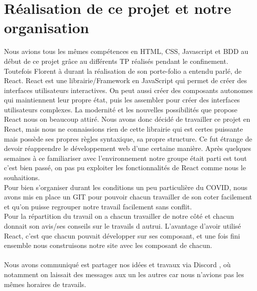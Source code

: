 \documentclass[12pt]{report}
\begin{document}
\section{Réalisation de ce projet et notre organisation}
	Nous avions tous les mêmes compétences en HTML, CSS, Javascript et BDD au début de ce projet grâce au différents TP réalisés pendant le confinement. Toutefois Florent à durant la réalisation de son porte-folio a entendu parlé, de React. React\cite{React} est une librairie/Framework en JavaScript qui permet de créer des interfaces utilisateurs interactives. On peut aussi créer des composants autonomes qui maintiennent leur propre état, puis les assembler pour créer des interfaces utilisateurs complexes. La modernité et les nouvelles possibilités que propose React nous on beaucoup attiré. Nous avons donc décidé de travailler ce projet en React, mais nous ne connaissions rien de cette librairie qui est certes puissante mais possède ses propres règles syntaxique, sa propre structure. Ce fut étrange de devoir réapprendre le développement web d'une certaine manière. Après quelques semaines à ce familiariser avec l'environnement notre groupe était parti est tout c'est bien passé, on pas pu exploiter les fonctionnalités de React comme nous le souhaitions. \\
	Pour bien s'organiser durant les conditions un peu particulière du COVID, nous avons mis en place un GIT pour pouvoir chacun travailler de son coter facilement et qu'on puisse regrouper notre travail facilement sans conflit.\\
	Pour la répartition du travail on a chacun travailler de notre côté et chacun donnait son avis/ses conseils sur le travails d autrui. L'avantage d'avoir utilisé React, c'est que chacun pouvait développer sur ses composant, et une fois fini ensemble nous construisons notre site avec les composant de chacun.\\
	\\
	Nous avons communiqué est partager nos idées et travaux via Discord \cite{Discord}, où notamment on laissait des messages aux un les autres car nous n'avions pas les mêmes horaires de travails.
\end{document}
